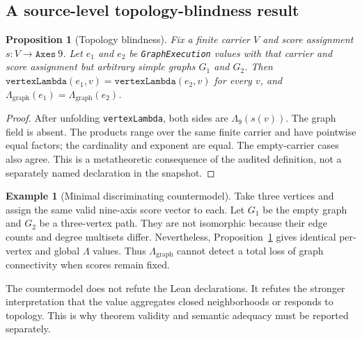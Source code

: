 \documentclass[10pt,letterpaper]{article}
\newtheorem{proposition}[theorem]{Proposition}
\theoremstyle{definition}
\newtheorem{example}[theorem]{Example}
\newcommand{\Lam}{\Lambda}
\newcommand{\Lgraph}{\Lambda_{\mathrm{graph}}}
\begin{document}
\subsection{A source-level topology-blindness result}
\begin{proposition}[Topology blindness]\label{prop:blind}
Fix a finite carrier \(V\) and score assignment \(s:V\to\texttt{Axes}\ 9\).
Let \(e_1\) and \(e_2\) be \texttt{GraphExecution} values with that carrier and
score assignment but arbitrary simple graphs \(G_1\) and \(G_2\). Then
\(\texttt{vertexLambda}(e_1,v)=\texttt{vertexLambda}(e_2,v)\) for every \(v\),
and \(\Lgraph(e_1)=\Lgraph(e_2)\).
\end{proposition}
\begin{proof}
After unfolding \texttt{vertexLambda}, both sides are
\(\Lam_9(s(v))\). The graph field is absent. The products range over the same
finite carrier and have pointwise equal factors; the cardinality and exponent
are equal. The empty-carrier cases also agree. This is a metatheoretic
consequence of the audited definition, not a separately named declaration in
the snapshot.
\end{proof}

\begin{example}[Minimal discriminating countermodel]\label{ex:empty-path}
Take three vertices and assign the same valid nine-axis score vector to each.
Let \(G_1\) be the empty graph and \(G_2\) be a three-vertex path. They are not
isomorphic because their edge counts and degree multisets differ. Nevertheless,
Proposition~\ref{prop:blind} gives identical per-vertex and global
\(\Lam\) values. Thus \(\Lgraph\) cannot detect a total loss of graph
connectivity when scores remain fixed.
\end{example}
The countermodel does not refute the Lean declarations. It refutes the stronger
interpretation that the value aggregates closed neighborhoods or responds to
topology. This is why theorem validity and semantic adequacy must be reported
separately.
\end{document}

